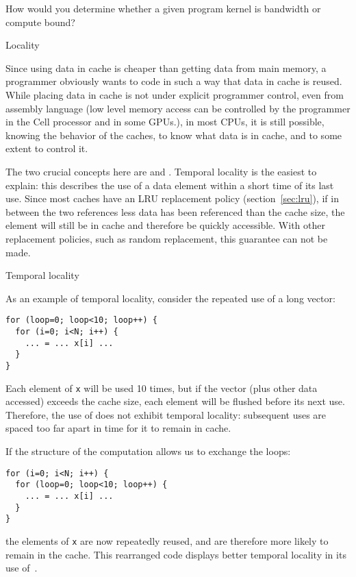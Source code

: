 

\begin{exercise}
  How would you determine whether a given program kernel is bandwidth
  or compute bound?
\end{exercise}

 {Locality}
\label{sec:locality}

Since using data in cache is cheaper than getting data from main
memory, a programmer obviously wants to code in such a way that data
in cache is reused. While placing data in cache is not under explicit
programmer control, even from assembly language
(low level memory access can be controlled by the
    programmer in the Cell processor and in some GPUs.),
in most \acp{CPU}, it is still
possible, knowing the behavior of the caches, to know
what data is in cache, and to some extent to control it.

The two crucial concepts here are
 and
. Temporal locality is the easiest to explain: this
describes the use of a data element within a short time of its last
use.  Since most caches have an \ac{LRU} replacement policy
(section~\ref{sec:lru}), if in between the two references less data
has been referenced than the cache size, the element will still be in
cache and therefore be quickly accessible. With other replacement
policies, such as random replacement, this guarantee can not be made.

 {Temporal locality}

As an example of temporal locality, consider the repeated use of a
long vector:
\begin{lstlisting}
for (loop=0; loop<10; loop++) {
  for (i=0; i<N; i++) {
    ... = ... x[i] ...
  }
}
\end{lstlisting}
Each element of \texttt{x} will be used 10 times, but if the vector
(plus other data accessed) exceeds
the cache size, each element will be flushed before its
next use. Therefore, the use of  does not exhibit temporal
locality: subsequent uses are spaced too far apart in time for it to
remain in cache. 

If the structure of the computation allows us to exchange
the loops:
\begin{lstlisting}
for (i=0; i<N; i++) {
  for (loop=0; loop<10; loop++) {
    ... = ... x[i] ...
  }
}
\end{lstlisting}
the elements of \texttt{x} are now repeatedly reused, and are
therefore more likely to remain in the cache. This rearranged code
displays better
temporal locality in its use of~.

